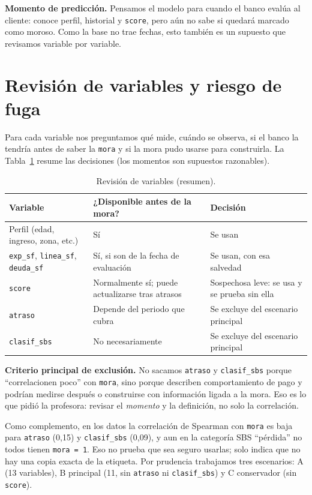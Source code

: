 \documentclass[11pt,a4paper]{article}
\begin{document}
\textbf{Momento de predicción.} Pensamos el modelo para cuando el banco evalúa al cliente: conoce perfil, historial y \texttt{score}, pero aún no sabe si quedará marcado como moroso. Como la base no trae fechas, esto también es un supuesto que revisamos variable por variable.

\section{Revisión de variables y riesgo de fuga}

Para cada variable nos preguntamos qué mide, cuándo se observa, si el banco la tendría antes de saber la \texttt{mora} y si la mora pudo usarse para construirla. La Tabla~\ref{tab:variables} resume las decisiones (los momentos son supuestos razonables).

\begin{table}[H]
  \centering
  \caption{Revisión de variables (resumen).}
  \label{tab:variables}
  \small
  \begin{tabular}{@{}lll@{}}
    \toprule
    Variable & ¿Disponible antes de la mora? & Decisión \\
    \midrule
    Perfil (edad, ingreso, zona, etc.) & Sí & Se usan \\
    \texttt{exp\_sf}, \texttt{linea\_sf}, \texttt{deuda\_sf} & Sí, si son de la fecha de evaluación & Se usan, con esa salvedad \\
    \texttt{score} & Normalmente sí; puede actualizarse tras atrasos & Sospechosa leve: se usa y se prueba sin ella \\
    \texttt{atraso} & Depende del periodo que cubra & Se excluye del escenario principal \\
    \texttt{clasif\_sbs} & No necesariamente & Se excluye del escenario principal \\
    \bottomrule
  \end{tabular}
\end{table}

\textbf{Criterio principal de exclusión.} No sacamos \texttt{atraso} y \texttt{clasif\_sbs} porque ``correlacionen poco'' con \texttt{mora}, sino porque describen comportamiento de pago y podrían medirse después o construirse con información ligada a la mora. Eso es lo que pidió la profesora: revisar el \emph{momento} y la definición, no solo la correlación.

Como complemento, en los datos la correlación de Spearman con \texttt{mora} es baja para \texttt{atraso} (0,15) y \texttt{clasif\_sbs} (0,09), y aun en la categoría SBS ``pérdida'' no todos tienen \texttt{mora = 1}. Eso no prueba que sea seguro usarlas; solo indica que no hay una copia exacta de la etiqueta. Por prudencia trabajamos tres escenarios: A (13 variables), B principal (11, sin \texttt{atraso} ni \texttt{clasif\_sbs}) y C conservador (sin \texttt{score}).
\end{document}
